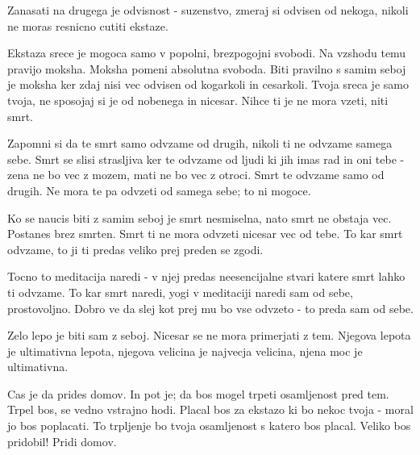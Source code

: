 Zanasati na drugega je odvisnost - suzenstvo, zmeraj si odvisen od nekoga, nikoli ne moras resnicno cutiti ekstaze. 

Ekstaza srece je mogoca samo v popolni, brezpogojni svobodi. Na vzshodu temu pravijo moksha. Moksha pomeni absolutna svoboda. Biti pravilno s samim seboj je moksha ker zdaj nisi vec odvisen od kogarkoli in cesarkoli. Tvoja sreca je samo tvoja, ne sposojaj si je od nobenega in nicesar. Nihce ti je ne mora vzeti, niti smrt. 

Zapomni si da te smrt samo odvzame od drugih, nikoli ti ne odvzame samega sebe. Smrt se slisi strasljiva ker te odvzame od ljudi ki jih imas rad in oni tebe - zena ne bo vec z mozem, mati ne bo vec z otroci. Smrt te odvzame samo od drugih. Ne mora te pa odvzeti od samega sebe; to ni mogoce. 

Ko se naucis biti z samim seboj je smrt nesmiselna, nato smrt ne obstaja vec. Postanes brez smrten. Smrt ti ne mora odvzeti nicesar vec od tebe. To kar smrt odvzame, to ji ti predas veliko prej preden se zgodi. 

Tocno to meditacija naredi - v njej predas neesencijalne stvari katere smrt lahko ti odvzame. To kar smrt naredi, yogi v meditaciji naredi sam od sebe, prostovoljno. Dobro ve da slej kot prej mu bo vse odvzeto - to preda sam od sebe. 

Zelo lepo je biti sam z seboj. Nicesar se ne mora primerjati z tem. Njegova lepota je ultimativna lepota, njegova velicina je najvecja velicina, njena moc je ultimativna. 

Cas je da prides domov. In pot je; da bos mogel trpeti osamljenost pred tem. Trpel bos, se vedno vstrajno hodi. Placal bos za ekstazo ki bo nekoc tvoja - moral jo bos poplacati. To trpljenje bo tvoja osamljenost s katero bos placal. Veliko bos pridobil! Pridi domov. 